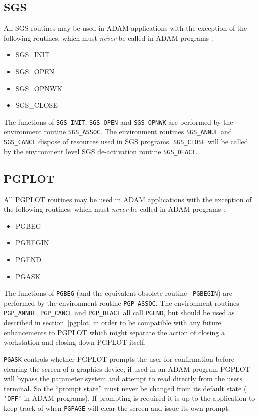 \subsection{SGS}

All SGS routines may be used in ADAM applications with the exception of the
following routines, which must {\em never} be called in ADAM programs :
\begin{itemize}
\item SGS\_INIT
\item SGS\_OPEN
\item SGS\_OPNWK
\item SGS\_CLOSE
\end{itemize}
The functions of {\tt SGS\_INIT}, {\tt SGS\_OPEN} and {\tt SGS\_OPNWK} are 
performed by the environment routine {\tt SGS\_ASSOC}.
The environment routines {\tt SGS\_ANNUL} and {\tt SGS\_CANCL} dispose of 
resources used in SGS programs.  {\tt SGS\_CLOSE} will be called by the 
environment level SGS de-activation routine {\tt SGS\_DEACT}.

\subsection{PGPLOT}

All PGPLOT routines may be used in ADAM applications with the exception of the
following routines, which must {\em never} be called in ADAM programs :
\begin{itemize}
\item PGBEG
\item PGBEGIN
\item PGEND
\item PGASK
\end{itemize}
The functions of {\tt PGBEG} (and the equivalent obsolete routine {\tt 
PGBEGIN}) are performed by the environment routine {\tt PGP\_ASSOC}. The 
environment routines {\tt PGP\_ANNUL}, {\tt PGP\_CANCL} and {\tt PGP\_DEACT}
 all call {\tt PGEND}, but should be used as
described in section~\ref{pgplot} in order to be compatible with any future
enhancements to PGPLOT which might separate the action of closing a
workstation and closing down PGPLOT itself.

{\tt PGASK} controls whether PGPLOT prompts the user for confirmation before 
clearing
the screen of a graphics device; if used in an ADAM program PGPLOT will bypass
the parameter system and attempt to read directly from the users terminal. So
the ``prompt state'' must never be changed from its default state ({\tt
'OFF'} in
ADAM programs). If prompting is required it is up to the application to keep
track of when {\tt PGPAGE} will clear the screen and issue its own prompt.

